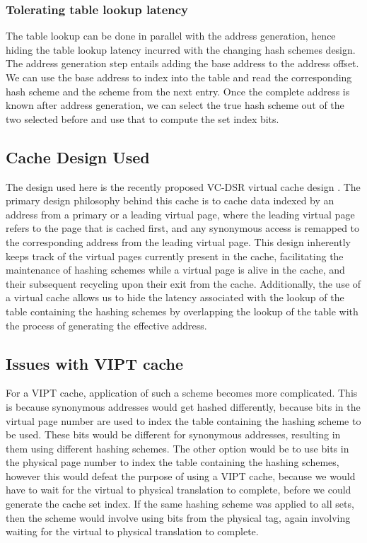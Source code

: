 \subsubsection{Tolerating table lookup latency}
The table lookup can be done in parallel with the address generation, hence hiding the table lookup latency incurred with the changing hash schemes design. The address generation step entails adding the base address to the address offset. We can use the base address to index into the table and read the corresponding hash scheme and the scheme from the next entry. Once the complete address is known after address generation, we can select the true hash scheme out of the two selected before and use that to compute the set index bits. 

\subsection{Cache Design Used}
The design used here is the recently proposed VC-DSR virtual cache design \cite{yoon2016revisiting}. The primary design philosophy behind this cache is to cache data indexed by an address from a primary or a leading virtual page, where the leading virtual page refers to the page that is cached first, and any synonymous access is remapped to the corresponding address from the leading virtual page.  This design inherently keeps track of the virtual pages currently present in the cache, facilitating the maintenance of hashing schemes while a virtual page is alive in the cache, and their subsequent recycling upon their exit from the cache. Additionally, the use of a virtual cache allows us to hide the latency associated with the lookup of the table containing the hashing schemes by overlapping the lookup of the table with the process of generating the effective address. 

\subsection{Issues with VIPT cache}
For a VIPT cache, application of such a scheme becomes more complicated. This is because synonymous addresses would get hashed differently, because bits in the virtual page number are used to index the table containing the hashing scheme to be used. These bits would be different for synonymous addresses, resulting in them using different hashing schemes. The other option would be to use bits in the physical page number to index the table containing the hashing schemes, however this would defeat the purpose of using a VIPT cache, because we would have to wait for the virtual to physical translation to complete, before we could generate the cache set index. If the same hashing scheme was applied to all sets, then the scheme would involve using bits from the physical tag, again involving waiting for the virtual to physical translation to complete. 

